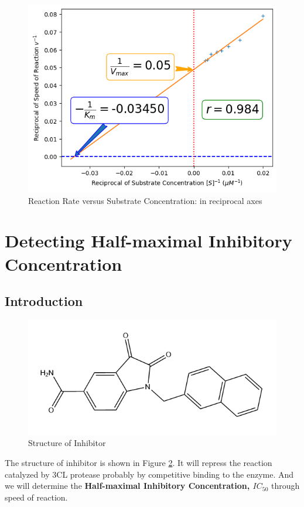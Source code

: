 \documentclass{report}
\begin{document}
\begin{figure}
    \centering
    \includegraphics[width=1\linewidth]{../Figures/substrate3.png}
    \caption{Reaction Rate versus Substrate Concentration: in reciprocal axes}
    \label{Reaction Rate versus Substrate Concentration: in reciprocall axes}
\end{figure}


\section{Detecting Half-maximal Inhibitory Concentration}

\subsection{Introduction}
\begin{figure}
    \centering
    \includegraphics[width=0.7\linewidth]{../Figures/inhibitor structure.png}
    \caption{Structure of Inhibitor}
    \label{Structure of Inhibitor}
\end{figure}
The structure of inhibitor is shown in Figure \ref{Structure of Inhibitor}.
It will repress the reaction catalyzed by 3CL protease probably by competitive binding to the enzyme.
And we will determine the \textbf{Half-maximal Inhibitory Concentration, $IC_{50}$} through speed of reaction.
\end{document}
